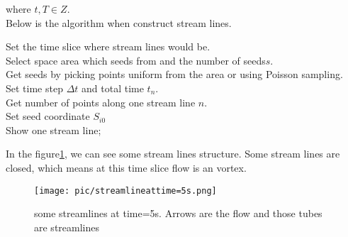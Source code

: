 \documentclass[
     11pt,         %
     a4paper,      %
     oneside,
     ]{article}
\begin{document}
	where $t,T\in Z$.\\ 
	Below is the algorithm when construct stream lines.\\
	\begin{algorithm}[H]
		Set the time slice where stream lines would be.\\
		Select space area which seeds from and the number of seeds$s$.\\
		Get seeds by picking points uniform from the area or using Poisson sampling.\\ 
		Set time step $\Delta t$ and total time $t_{n}$. \\
		Get number of points along one stream line $n$.\\
		{
			Set seed coordinate $S_{i0}$\\
			Show one stream line;
			}
	\end{algorithm}
    In the figure\ref{fig:streamlineattime=5s}, we can see some stream lines structure. Some stream lines are closed, which means at this time slice flow is an vortex.
	\begin{figure}[H]
	\centering
	\texttt{[image: pic/streamlineattime=5s.png]}
	\caption{{\tiny some streamlines at time=5s. Arrows are the flow and those tubes are streamlines}}
	\label{fig:streamlineattime=5s}
	\end{figure}
	
\end{document}
